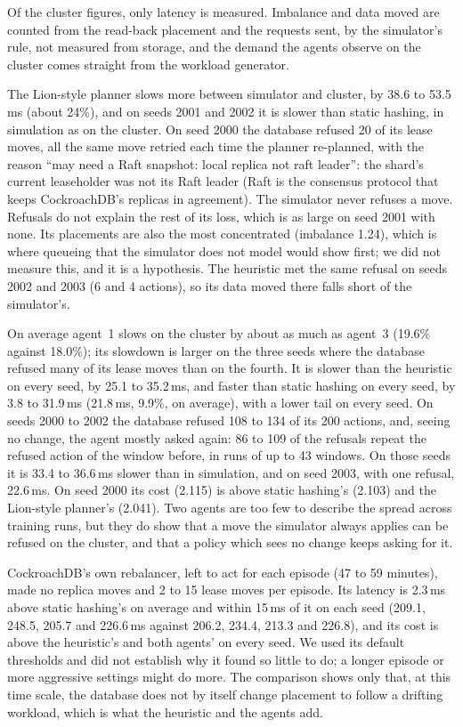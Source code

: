 Of the cluster figures, only latency is measured. Imbalance and data moved
are counted from the read-back placement and the requests sent, by the
simulator's rule, not measured from storage, and the demand the agents observe on
the cluster comes straight from the workload generator.

The Lion-style planner slows more between simulator and cluster, by 38.6 to
53.5\,ms (about 24\%), and on seeds 2001 and 2002 it is slower than static
hashing, in simulation as on the cluster. On seed 2000 the database refused 20
of its lease moves, all the same move retried each time the planner re-planned,
with the reason ``may need a Raft snapshot: local replica not raft leader'':
the shard's current leaseholder was not its Raft leader (Raft is the consensus
protocol that keeps CockroachDB's replicas in agreement). The simulator never
refuses a move. Refusals do not explain the rest of its loss, which is as large
on seed 2001 with none. Its placements are also the most concentrated
(imbalance 1.24), which is where queueing that the simulator does not model
would show first; we did not measure this, and it is a hypothesis. The
heuristic met the same refusal on seeds 2002 and 2003 (6 and 4 actions), so its
data moved there falls short of the simulator's.

On average agent~1 slows on the cluster by about as much as agent~3 (19.6\%
against 18.0\%); its slowdown is larger on the three seeds where the database
refused many of its lease moves than on the fourth. It is slower than the heuristic on every
seed, by 25.1 to 35.2\,ms, and faster than static hashing on every seed, by 3.8
to 31.9\,ms (21.8\,ms, 9.9\%, on average), with a lower tail on every seed. On
seeds 2000 to 2002 the database refused 108 to 134 of its 200 actions, and,
seeing no change, the agent mostly asked again: 86 to 109 of the refusals repeat
the refused action of the window before, in runs of up to 43 windows. On those
seeds it is 33.4 to 36.6\,ms slower than in simulation, and on seed 2003, with
one refusal, 22.6\,ms. On seed 2000 its cost (2.115) is above static hashing's
(2.103) and the Lion-style planner's (2.041). Two agents are too few to describe
the spread across training runs, but they do show that a move the simulator
always applies can be refused on the cluster, and that a policy which sees no
change keeps asking for it.

CockroachDB's own rebalancer, left to act for each episode (47 to 59 minutes),
made no replica moves and 2 to 15 lease moves per episode. Its latency is
2.3\,ms above static hashing's on average and within 15\,ms of it on each seed
(209.1, 248.5, 205.7 and 226.6\,ms against 206.2, 234.4, 213.3 and 226.8), and
its cost is above the heuristic's and both agents' on every seed. We used its
default thresholds and did not establish why it found so little to do; a longer
episode or more aggressive settings might do more. The comparison shows only
that, at this time scale, the database does not by itself change placement to
follow a drifting workload, which is what the heuristic and the agents add.

